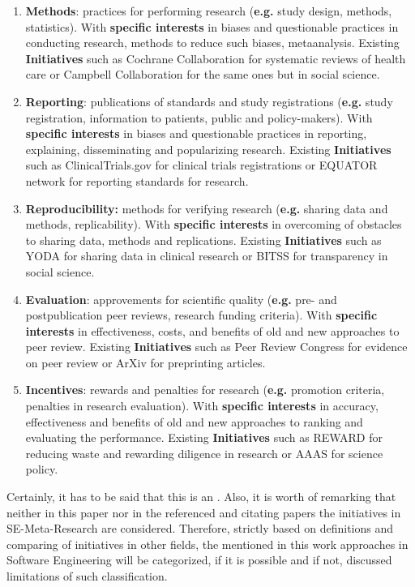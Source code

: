 		\begin{enumerate}
			\item{\textbf{Methods}:} practices for performing research  (\textbf{e.g.} study design, methods, statistics). With \textbf{specific interests} in biases and questionable practices in conducting
			research, methods to reduce such biases, metaanalysis. Existing \textbf{Initiatives} such as Cochrane Collaboration for systematic reviews of health care or Campbell Collaboration for the same ones but in social science.
			   
			\item{\textbf{Reporting}:} publications of standards and study registrations  (\textbf{e.g.} study registration, information to patients, public and policy-makers). With \textbf{specific interests} in biases and questionable practices in reporting, explaining, disseminating and popularizing research. Existing \textbf{Initiatives} such as ClinicalTrials.gov for clinical trials registrations or EQUATOR network for reporting standards for research.
			
			\item\textbf{{Reproducibility}:} methods for verifying research (\textbf{e.g.} sharing data and methods, replicability). With \textbf{specific interests} in overcoming of obstacles to sharing data, methods and replications. Existing \textbf{Initiatives} such as YODA for sharing data in clinical research or BITSS for transparency in social science. 
			
			\item{\textbf{Evaluation}:} approvements for scientific quality (\textbf{e.g.} pre- and postpublication peer reviews, research funding criteria). With \textbf{specific interests} in  effectiveness, costs, and benefits of old and new approaches to peer review. Existing \textbf{Initiatives} such as Peer Review Congress for evidence on peer review or ArXiv for preprinting articles. 
			 
			\item{\textbf{Incentives}:} rewards and penalties for research (\textbf{e.g.} promotion criteria, penalties in research evaluation). With \textbf{specific interests} in accuracy, effectiveness and benefits of old and new approaches to ranking and evaluating the performance. Existing \textbf{Initiatives} such as REWARD for reducing waste and rewarding diligence in research or AAAS for science policy.
		\end{enumerate}
		 Certainly, it has to be said that this is an \frqq. Also, it is worth of remarking that neither in this paper nor in the referenced and citating papers the initiatives in SE-Meta-Research are considered. Therefore, strictly based on definitions and comparing of initiatives in other fields, the mentioned in this work approaches in Software Engineering will be categorized, if it is possible and if not, discussed limitations of such classification. 
		

